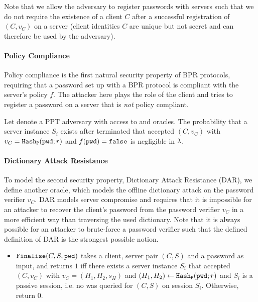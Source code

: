 \noindent
Note that we allow the adversary to register passwords with servers such that we do not require the existence of a client $C$ after a successful registration of $(C,v_C)$ on a server (client identities $C$ are unique but not secret and can therefore be used by the adversary).

\paragraph{Policy Compliance}
Policy compliance is the first natural security property of BPR protocols, requiring that a password set up with a BPR protocol is compliant with the server's policy $f$.
The attacker here plays the role of the client and tries to register a password \pwd on a server that is \emph{not} policy compliant.

\begin{definition}\label{def:pc}
Let \cA denote a PPT adversary with access to \Execute and \Send oracles.
The probability that a server instance $S_i$ exists after \cA terminated that accepted $(C,v_C)$ with $v_C=\mathtt{Hash_P}(\mathtt{pwd};r)$ and $f(\mathtt{pwd})=\mathtt{false}$ is negligible in $\lambda$.
\eod
\end{definition}

\paragraph{Dictionary Attack Resistance}
To model the second security property, Dictionary Attack Resistance (DAR), we define another oracle, which models the offline dictionary attack on the password verifier $v_C$.
DAR models server compromise and requires that it is impossible for an attacker to recover the client's password from the password verifier $v_C$ in a more efficient way than traversing the used dictionary.
Note that it is always possible for an attacker to brute-force a password verifier such that the defined definition of DAR is the strongest possible notion.

\begin{itemize}
  \item $\mathtt{Finalise}(C,S,\mathtt{pwd})$ takes a client, server pair $(C,S)$ and a password \pwd as input, and returns $1$ iff there exists a server instance $S_i$ that accepted $(C,v_C)$ with $v_C=(H_1,H_2,s_H)$ and $(H_1,H_2)\gets\mathtt{Hash_P}(\mathtt{pwd};r)$ and $S_i$ is a passive session, i.e. no \Send was queried for $(C,S)$ on session $S_i$.
        Otherwise, return $0$.
\end{itemize}

